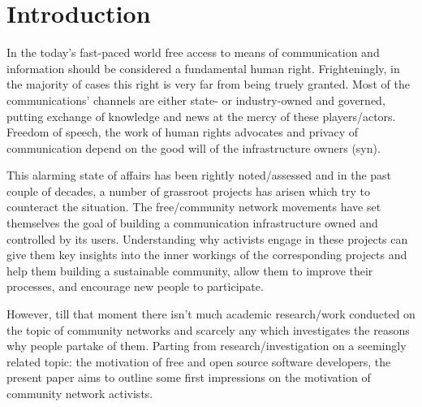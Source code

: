\section{Introduction}

In the today's fast-paced world free access to means of communication and information should be considered a fundamental human right.
Frighteningly, in the majority of cases this right is very far from being truely granted.
Most of the communications' channels are either state- or industry-owned and governed, putting exchange of knowledge and news at the mercy of these players/actors.
Freedom of speech, the work of human rights advocates and privacy of communication depend on the good will of the infrastructure owners (syn).

This alarming state of affairs has been rightly noted/assessed and in the past couple of decades, a number of grassroot projects has arisen which try to counteract the situation.
The free/community network movements have set themselves the goal of building a communication infrastructure owned and controlled by its users.
Understanding why activists engage in these projects can give them key insights into the inner workings of the corresponding projects and help them building a sustainable community, allow them to improve their processes, and encourage new people to participate.

However, till that moment there isn't much academic research/work conducted on the topic of community networks and scarcely any which investigates the reasons why people partake of them.
Parting from research/investigation on a seemingly related topic: the motivation of free and open source software developers, the present paper aims to outline some first impressions on the motivation of community network activists.

\begin{comment}
* Untersuchungsgegenstand
* Erkenntnisinteresse
* Forschungsstand
* Ergebnisse können/sollen angedeuten werden

Why is the topic relevant??

* grassroots movements
* one of the free/open movements which is relatively understudied till now
* understanding why
  ** may enhance motivation and performance (or not);
  ** or give activists insights into how to improve their processes
\end{comment}


